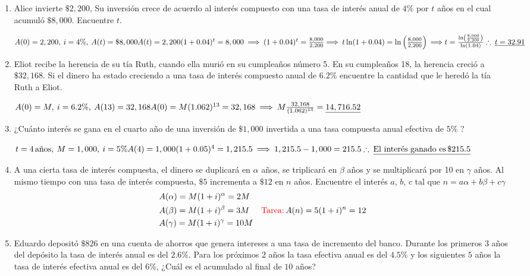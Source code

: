 \begin{enumerate}
\item Alice invierte $\$2,200$, Su inversión crece de acuerdo al interés compuesto con una tasa de interés anual de $4\%$ por $t$ años en el cual acumuló $\$8,000$. Encuentre $t$.

$A(0) = 2,200,\: i=4\%,\: A(t) = \$ 8,000 \\
\hfill \\
A(t) = 2,200(1+0.04)^t = 8,000 \: \Longrightarrow \: (1+0.04)^t = \frac{8,000}{2,200} \\
\Longrightarrow \: t\ln(1+0.04) = \ln\left( \frac{8,000}{2,200}\right) \\
\Longrightarrow t = \frac{\ln\left(\frac{8,000}{2,200} \right) }{\ln(1.04)}\\
\hfill\\
\therefore \: \underline{t=32.91}$
\newpage
\item Eliot recibe la herencia de su tía Ruth, cuando ella murió en su cumpleaños número 5. En su cumpleaños 18, la herencia creció a $\$ 32,168$. Si el dinero ha estado creciendo a una tasa de interés compuesto anual de $6.2\%$ encuentre la cantidad que le heredó la tía Ruth a Eliot.

$A(0) = M,\: i = 6.2\%,\: A(13) = 32,168\\
\hfill
\\
A(0) = M(1.062)^{13} = 32,168 \: \Longrightarrow \: M\frac{32,168}{(1.062)^{13}} = \underline{14,716.52}$

\item ¿Cuánto interés se gana en el cuarto año de una inversión de $\$1,000$ invertida a una tasa compuesta anual efectiva de $5\%$ ?

$t = 4\, \text{años}, \: M=1,000,\: i = 5\% \\
\hfill \\
A(4) = 1,000(1+0.05)^4 = 1,215.5 \: \Longrightarrow \: 1,215.5 - 1,000 = 215.5\\
\therefore \: \underline{\text{El interés ganado es} \, \$ 215.5}$
\item A una cierta tasa de interés compuesta, el dinero se duplicará en $\alpha$ años, se triplicará en $\beta$ años y se multiplicará por 10 en $\gamma$ años. Al mismo tiempo con una tasa de interés compuesta, $\$5$ incrementa a $\$12$ en $n$ años. Encuentre el interés $a$, $b$, $c$ tal que $n=a\alpha + b\beta + c\gamma$
\begin{align*}
& A(\alpha) = M(1 + i)^{\alpha} = 2M  & \hfill \hfill \\
& A(\beta) = M(1+i)^{\beta} = 3M  & \textcolor{red}{\text{Tarea:}} \, A(n) = 5 (1+i)^n = 12 \\
& A(\gamma) = M(1+i)^{\gamma} = 10M
\end{align*}
\item Eduardo depositó $\$ 826$ en una cuenta de ahorros que genera intereses a una tasa de incremento del banco. Durante los primeros $3$ años del depósito la tasa de interés anual es del $2.6\%$. Para los próximos $2$ años la tasa efectiva anual es del $4.5\%$ y los siguientes $5$ años la tasa de interés efectiva anual es del $6\%$, ¿Cuál es el acumulado al final de $10$ años?


\end{enumerate}
